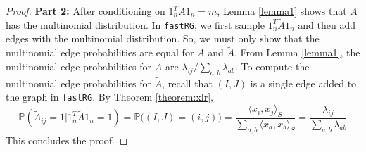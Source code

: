 \documentclass[twoside,11pt]{article}
\begin{document}
\begin{proof}
\textbf{Part 2:} After conditioning on $1_n^T A 1_n = m$,  Lemma \ref{lemma1} shows that $A$ has the multinomial distribution.  In \texttt{fastRG}, we first sample $1_n^T \tilde A1_n$ and then add edges with the multinomial distribution.  So,  we must only show that the multinomial edge probabilities are equal for $A$ and $\tilde A$.  From Lemma \ref{lemma1}, the multinomial edge probabilities for $A$ are $\lambda_{ij} /\sum_{a,b} \lambda_{ab} $.
%
To compute the multinomial edge probabilities for $\tilde A$, recall that $(I,J)$ is a single edge added to the graph in \texttt{fastRG}. By Theorem \ref{theorem:xlr},
\[\mathbb{P}(\tilde A_{ij} = 1 | 1_n^T\tilde A1_n = 1  ) =  \mathbb{P}\big((I,J)=(i,j)\big) = \frac{\langle x_i, x_j\rangle_S}{\sum_{a,b} \langle x_a, x_b\rangle_S} =  \frac{\lambda_{ij}}{\sum_{a,b} \lambda_{ab}}\]
This concludes the proof.
\end{proof}
\end{document}
